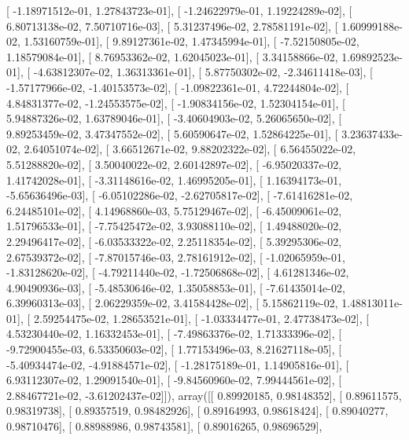 \documentclass{article}
\begin{document}
       [ -1.18971512e-01,   1.27843723e-01],
       [ -1.24622979e-01,   1.19224289e-02],
       [  6.80713138e-02,   7.50710716e-03],
       [  5.31237496e-02,   2.78581191e-02],
       [  1.60999188e-02,   1.53160759e-01],
       [  9.89127361e-02,   1.47345994e-01],
       [ -7.52150805e-02,   1.18579084e-01],
       [  8.76953362e-02,   1.62045023e-01],
       [  3.34158866e-02,   1.69892523e-01],
       [ -4.63812307e-02,   1.36313361e-01],
       [  5.87750302e-02,  -2.34611418e-03],
       [ -1.57177966e-02,  -1.40153573e-02],
       [ -1.09822361e-01,   4.72244804e-02],
       [  4.84831377e-02,  -1.24553575e-02],
       [ -1.90834156e-02,   1.52304154e-01],
       [  5.94887326e-02,   1.63789046e-01],
       [ -3.40604903e-02,   5.26065650e-02],
       [  9.89253459e-02,   3.47347552e-02],
       [  5.60590647e-02,   1.52864225e-01],
       [  3.23637433e-02,   2.64051074e-02],
       [  3.66512671e-02,   9.88202322e-02],
       [  6.56455022e-02,   5.51288820e-02],
       [  3.50040022e-02,   2.60142897e-02],
       [ -6.95020337e-02,   1.41742028e-01],
       [ -3.31148616e-02,   1.46995205e-01],
       [  1.16394173e-01,  -5.65636496e-03],
       [ -6.05102286e-02,  -2.62705817e-02],
       [ -7.61416281e-02,   6.24485101e-02],
       [  4.14968860e-03,   5.75129467e-02],
       [ -6.45009061e-02,   1.51796533e-01],
       [ -7.75425472e-02,   3.93088110e-02],
       [  1.49488020e-02,   2.29496417e-02],
       [ -6.03533322e-02,   2.25118354e-02],
       [  5.39295306e-02,   2.67539372e-02],
       [ -7.87015746e-03,   2.78161912e-02],
       [ -1.02065959e-01,  -1.83128620e-02],
       [ -4.79211440e-02,  -1.72506868e-02],
       [  4.61281346e-02,   4.90490936e-03],
       [ -5.48530646e-02,   1.35058853e-01],
       [ -7.61435014e-02,   6.39960313e-03],
       [  2.06229359e-02,   3.41584428e-02],
       [  5.15862119e-02,   1.48813011e-01],
       [  2.59254475e-02,   1.28653521e-01],
       [ -1.03334477e-01,   2.47738473e-02],
       [  4.53230440e-02,   1.16332453e-01],
       [ -7.49863376e-02,   1.71333396e-02],
       [ -9.72900455e-03,   6.53350603e-02],
       [  1.77153496e-03,   8.21627118e-05],
       [ -5.40934474e-02,  -4.91884571e-02],
       [ -1.28175189e-01,   1.14905816e-01],
       [  6.93112307e-02,   1.29091540e-01],
       [ -9.84560960e-02,   7.99444561e-02],
       [  2.88467721e-02,  -3.61202437e-02]]), array([[ 0.89920185,  0.98148352],
       [ 0.89611575,  0.98319738],
       [ 0.89357519,  0.98482926],
       [ 0.89164993,  0.98618424],
       [ 0.89040277,  0.98710476],
       [ 0.88988986,  0.98743581],
       [ 0.89016265,  0.98696529],
\end{document}
